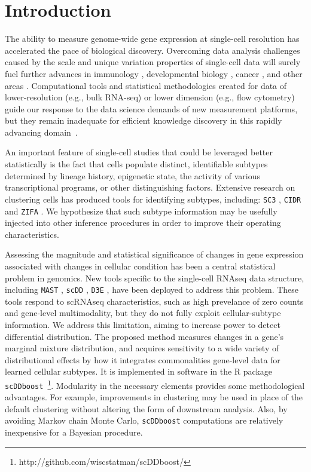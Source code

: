\documentclass[aoas,preprint]{imsart}
\begin{document}
\begin{frontmatter}
\end{frontmatter}

\section{Introduction}

The ability to measure genome-wide gene expression at single-cell resolution 
has accelerated the pace of biological discovery.  Overcoming data
analysis challenges caused by the scale and unique variation properties of single-cell
data will surely fuel further advances in immunology \citep{immune}, developmental
biology \citep{dv}, cancer \citep{cancer}, and other areas \citep{scs}. 
 Computational tools and statistical methodologies 
created for data of lower-resolution (e.g., bulk RNA-seq) or lower dimension 
(e.g., flow cytometry)  guide our response to 
 the data science demands of new measurement platforms,
but they remain inadequate for efficient knowledge discovery in this
rapidly advancing domain~\citep{Bacher2016}.

An important feature of single-cell studies that could be leveraged better
statistically is the fact that cells populate distinct, identifiable subtypes
determined by lineage history, epigenetic state, the activity
of various transcriptional programs, or other 
distinguishing factors. Extensive research on clustering cells
has produced tools for identifying subtypes, including: 
 \verb+SC3+ \citep{sc3}, \verb+CIDR+ \citep{CIDR} and \verb+ZIFA+ \citep{ZIFA}.
We hypothesize that such
subtype information may be usefully injected into other inference procedures in order
to improve their operating characteristics. 

Assessing the magnitude and statistical significance of changes in gene
expression associated with changes in cellular condition has been a central
statistical problem in genomics. New tools specific to
the single-cell RNAseq data structure, including \verb+MAST+
\citep{ref:MAST}, \verb+scDD+ \citep{ref:scDD}, \verb+D3E+ \citep{ref:d3e},
have been deployed to address this problem.
These tools respond
to scRNAseq characteristics, such as high prevelance of zero counts and
gene-level multimodality, but they do not fully exploit cellular-subtype
information.  We address this limitation, aiming to increase power to detect differential distribution.
The proposed method measures changes in a gene's marginal mixture distribution, and
acquires sensitivity to a wide variety of distributional effects by how it integrates commonalities gene-level data for learned cellular subtypes.  It is implemented in  software 
in the R package \verb+scDDboost+~\footnote{http://github.com/wiscstatman/scDDboost/}.
Modularity in the necessary elements provides some methodological advantages. For example,
improvements in clustering may be used in place of the default clustering
without altering the form of downstream analysis.  Also, by avoiding Markov chain Monte Carlo,
\verb+scDDboost+ computations are relatively inexpensive for a Bayesian procedure.
\end{document}
